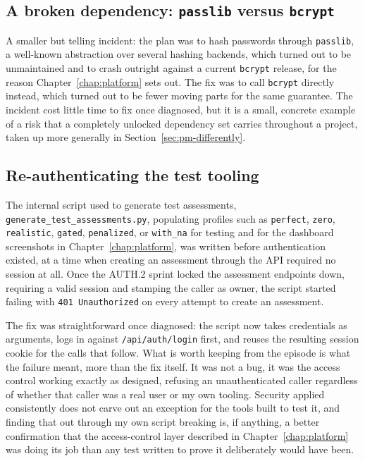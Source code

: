 \subsection{A broken dependency: \texttt{passlib} versus \texttt{bcrypt}}
\label{sec:pm-passlib}

A smaller but telling incident: the plan was to hash passwords through \texttt{passlib}, a well-known abstraction over several hashing backends, which turned out to be unmaintained and to crash outright against a current \texttt{bcrypt} release, for the reason Chapter~\ref{chap:platform} sets out. The fix was to call \texttt{bcrypt} directly instead, which turned out to be fewer moving parts for the same guarantee. The incident cost little time to fix once diagnosed, but it is a small, concrete example of a risk that a completely unlocked dependency set carries throughout a project, taken up more generally in Section~\ref{sec:pm-differently}.

\subsection{Re-authenticating the test tooling}
\label{sec:pm-test-script}

The internal script used to generate test assessments, \texttt{generate\_\allowbreak test\_\allowbreak assessments.py}, populating profiles such as \texttt{perfect}, \texttt{zero}, \texttt{realistic}, \texttt{gated}, \texttt{penalized}, or \texttt{with\_na} for testing and for the dashboard screenshots in Chapter~\ref{chap:platform}, was written before authentication existed, at a time when creating an assessment through the API required no session at all. Once the AUTH.2 sprint locked the assessment endpoints down, requiring a valid session and stamping the caller as owner, the script started failing with \texttt{401 Unauthorized} on every attempt to create an assessment.

The fix was straightforward once diagnosed: the script now takes credentials as arguments, logs in against \texttt{/api/auth/login} first, and reuses the resulting session cookie for the calls that follow. What is worth keeping from the episode is what the failure meant, more than the fix itself. It was not a bug, it was the access control working exactly as designed, refusing an unauthenticated caller regardless of whether that caller was a real user or my own tooling. Security applied consistently does not carve out an exception for the tools built to test it, and finding that out through my own script breaking is, if anything, a better confirmation that the access-control layer described in Chapter~\ref{chap:platform} was doing its job than any test written to prove it deliberately would have been.

